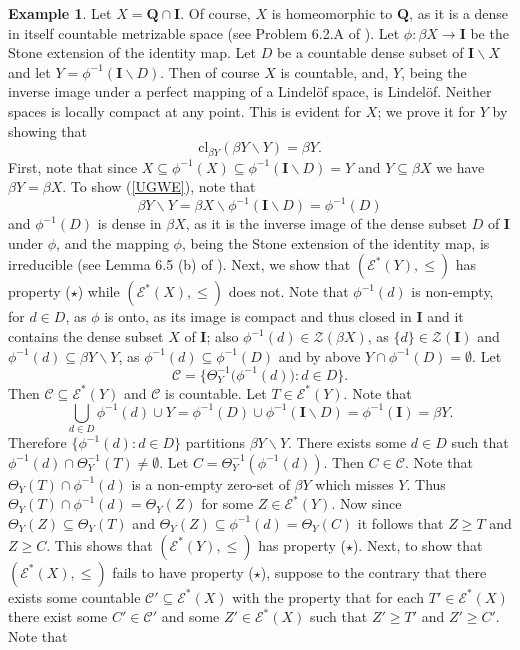 \documentclass{amsart}
\theoremstyle{definition}
\newtheorem{example}[theorem]{Example}
\theoremstyle{remark}
\theoremstyle{notation}
\numberwithin{equation}{section}
\begin{document}
\begin{example}
Let $X=\mathbf{Q}\cap \mathbf{I}$. Of course, $X$ is homeomorphic to $\mathbf{Q}$, as it is a dense in itself countable metrizable space (see Problem 6.2.A of \cite{E}). Let $\phi:\beta X\rightarrow\mathbf{I}$ be the Stone extension of the identity map. Let $D$ be a countable dense subset of $\mathbf{I}\backslash X$ and let $Y=\phi^{-1}(\mathbf{I}\backslash D)$. Then of course $X$ is countable, and, $Y$, being the inverse image under a perfect mapping of a Lindel\"{o}f space, is Lindel\"{o}f.  Neither spaces is locally compact at any point. This is evident for $X$; we prove it for $Y$ by showing that
\begin{equation}\label{UGWE}
\mbox{cl}_{\beta Y}(\beta Y\backslash Y)=\beta Y.
\end{equation}
First, note that since $X\subseteq\phi^{-1}(X)\subseteq\phi^{-1}(\mathbf{I}\backslash D)=Y$ and $Y\subseteq\beta X$ we have $\beta Y=\beta X$. To show (\ref{UGWE}), note that
\[\beta Y\backslash Y=\beta X\backslash \phi^{-1}(\mathbf{I}\backslash D)=\phi^{-1}(D)\]
and $\phi^{-1}(D)$ is dense in $\beta X$, as it is the inverse image of the dense subset $D$ of $\mathbf{I}$ under $\phi$, and the mapping $\phi$, being the Stone extension of the identity map, is irreducible (see Lemma 6.5 (b) of \cite{PW}). Next, we show that $({\mathscr E}^*(Y),\leq)$ has property ($\star$) while $({\mathscr E}^*(X),\leq)$ does not. Note that $\phi^{-1}(d)$ is non-empty, for $d\in D$, as $\phi$ is onto, as its image is compact and thus closed in $\mathbf{I}$ and it contains the dense subset $X$ of  $\mathbf{I}$; also $\phi^{-1}(d)\in{\mathscr Z}(\beta X)$, as $\{d\}\in{\mathscr Z}(\mathbf{I})$ and $\phi^{-1}(d)\subseteq\beta Y\backslash Y$, as  $\phi^{-1}(d)\subseteq\phi^{-1}(D)$ and by above $Y\cap\phi^{-1}(D)=\emptyset$.
Let
\[{\mathscr C}=\big\{\Theta_Y^{-1}\big(\phi^{-1}(d)\big):d\in D\big\}.\]
Then ${\mathscr C}\subseteq{\mathscr E}^*(Y)$ and ${\mathscr C}$ is countable. Let $T\in{\mathscr E}^*(Y)$. Note that
\[\bigcup_{d\in D}\phi^{-1}(d)\cup Y=\phi^{-1}(D)\cup \phi^{-1}(\mathbf{I}\backslash D)=\phi^{-1}(\mathbf{I})=\beta Y.\]
Therefore $\{\phi^{-1}(d):d\in D\}$ partitions $\beta Y\backslash Y$. There exists  some $d\in D$ such that $\phi^{-1}(d)\cap \Theta_Y^{-1}(T)\neq\emptyset$. Let $C=\Theta_Y^{-1}(\phi^{-1}(d))$. Then $C\in{\mathscr C}$. Note that $\Theta_Y(T)\cap\phi^{-1}(d)$ is a non-empty zero-set of $\beta Y$ which misses $Y$. Thus $\Theta_Y(T)\cap\phi^{-1}(d)=\Theta_Y(Z)$ for some $Z\in{\mathscr E}^*(Y)$. Now since  $\Theta_Y(Z)\subseteq\Theta_Y(T)$ and $\Theta_Y(Z)\subseteq\phi^{-1}(d)=\Theta_Y(C)$ it follows that $Z\geq T$ and $Z\geq C$. This shows that $({\mathscr E}^*(Y),\leq)$ has property ($\star$). Next, to show that $({\mathscr E}^*(X),\leq)$ fails to have property ($\star$), suppose to the contrary that there exists some countable ${\mathscr C}'\subseteq{\mathscr E}^*(X)$ with the property that for each $T'\in{\mathscr E}^*(X)$ there exist some $C'\in {\mathscr C}'$ and some $Z'\in {\mathscr E}^*(X)$ such that $Z'\geq T'$ and $Z'\geq C'$. Note that

\end{example}
\end{document}
